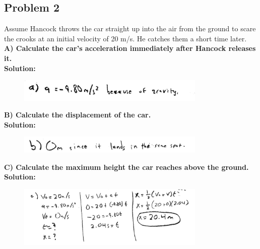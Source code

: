 \documentclass[a4paper,12pt]{article}
\begin{document}
\subsection{Problem 2}

Assume Hancock throws the car straight up into the air from the ground to scare the crooks at an initial velocity of 20 m/s. He catches them a short time later. \\

\noindent\textbf{A) Calculate the car's acceleration immediately after Hancock releases it.} \\

\noindent\textbf{Solution:}

\begin{figure}[H]
    \centering
    \includegraphics[width=0.8\textwidth]{U1_P2_A} %
\end{figure}


\noindent\textbf{B) Calculate the displacement of the car.} \\

\noindent\textbf{Solution:}

\begin{figure}[H]
    \centering
    \includegraphics[width=0.8\textwidth]{U1_P2_B} %
\end{figure}


\noindent\textbf{C) Calculate the maximum height the car reaches above the ground.}\\ 

\noindent\textbf{Solution:}

\begin{figure}[H]
    \centering
    \includegraphics[width=0.8\textwidth]{U1_P2_C} %
\end{figure}
\end{document}
